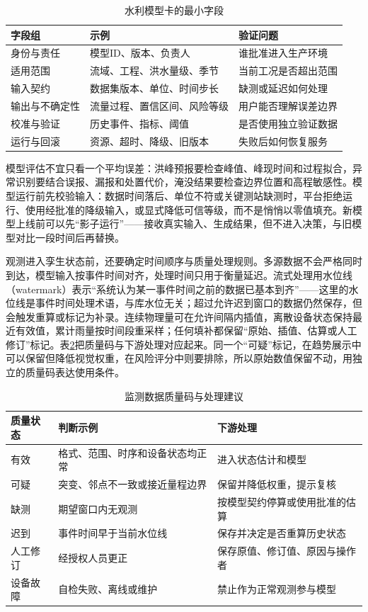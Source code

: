 \begin{table}[htbp]
\centering
\caption{水利模型卡的最小字段}
\label{tab:model-card}
\begin{tabular}{p{3.0cm}p{4.2cm}p{5.2cm}}
\toprule
字段组 & 示例 & 验证问题 \\
\midrule
身份与责任 & 模型ID、版本、负责人 & 谁批准进入生产环境 \\
适用范围 & 流域、工程、洪水量级、季节 & 当前工况是否超出范围 \\
输入契约 & 数据集版本、单位、时间步长 & 缺测或延迟如何处理 \\
输出与不确定性 & 流量过程、置信区间、风险等级 & 用户能否理解误差边界 \\
校准与验证 & 历史事件、指标、阈值 & 是否使用独立验证数据 \\
运行与回滚 & 资源、超时、降级、旧版本 & 失败后如何恢复服务 \\
\bottomrule
\end{tabular}
\end{table}

模型评估不宜只看一个平均误差：洪峰预报要检查峰值、峰现时间和过程拟合，异常识别要结合误报、漏报和处置代价，淹没结果要检查边界位置和高程敏感性。模型运行前先校验输入：数据时间落后、单位不符或关键测站缺测时，平台拒绝运行、使用经批准的降级输入，或显式降低可信等级，而不是悄悄以零值填充。新模型上线前可以先“影子运行”——接收真实输入、生成结果，但不进入决策，与旧模型对比一段时间后再替换。

观测进入孪生状态前，还要确定时间顺序与质量处理规则。多源数据不会严格同时到达，模型输入按事件时间对齐，处理时间只用于衡量延迟。流式处理用水位线（watermark）表示“系统认为某一事件时间之前的数据已基本到齐”——这里的水位线是事件时间处理术语，与库水位无关；超过允许迟到窗口的数据仍然保存，但会触发重算或标记为补录。连续物理量可在允许间隔内插值，离散设备状态保持最近有效值，累计雨量按时间段重采样；任何填补都保留“原始、插值、估算或人工修订”标记。表\ref{tab:dt-quality-flags}把质量码与下游处理对应起来。同一个“可疑”标记，在趋势展示中可以保留但降低视觉权重，在风险评分中则要排除，所以原始数值保留不动，用独立的质量码表达使用条件。

\begin{table}[htbp]
\centering
\caption{监测数据质量码与处理建议}
\label{tab:dt-quality-flags}
\begin{tabular}{p{2.4cm}p{4.5cm}p{5.8cm}}
\toprule
质量状态 & 判断示例 & 下游处理 \\
\midrule
有效 & 格式、范围、时序和设备状态均正常 & 进入状态估计和模型 \\
可疑 & 突变、邻点不一致或接近量程边界 & 保留并降低权重，提示复核 \\
缺测 & 期望窗口内无观测 & 按模型契约停算或使用批准的估算 \\
迟到 & 事件时间早于当前水位线 & 保存并决定是否重算历史状态 \\
人工修订 & 经授权人员更正 & 保存原值、修订值、原因与操作者 \\
设备故障 & 自检失败、离线或维护 & 禁止作为正常观测参与模型 \\
\bottomrule
\end{tabular}
\end{table}

